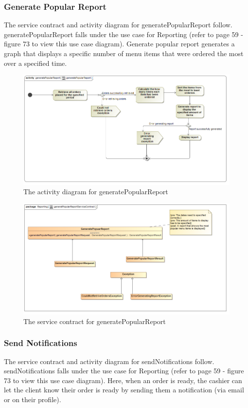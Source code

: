 \documentclass[a4paper,12pt]{report}
\begin{document}
\subsubsection{Generate Popular Report}
The service contract and activity diagram for generatePopularReport follow. generatePopularReport falls under the use case for Reporting (refer to page 59 - figure 73 to view this use case diagram). Generate popular report generates a graph that displays a specific number of menu items that were ordered the most over a specified time.
\begin{figure}[H]
 \centering
  \includegraphics[width=1.0\textwidth]{../images/generatePopularReportActivityDiagram.png}
    \caption{The activity diagram for generatePopularReport}
    \end{figure}
    
    \begin{figure}[H]
  \centering
    \includegraphics[width=1.0\textwidth]{../images/generatPopularReportServiceContract.png}
    \caption{The service contract for generatePopularReport} 
\end{figure}

\subsubsection{Send Notifications}
The service contract and activity diagram for sendNotifications follow. sendNotifications falls under the use case for Reporting (refer to page 59 - figure 73 to view this use case diagram). Here, when an order is ready, the cashier can let the client know their order is ready by sending them a notification (via email or on their profile).
\end{document}
